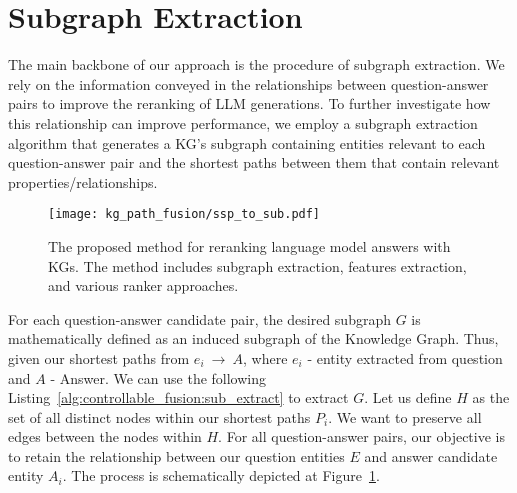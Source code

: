 
\section{Subgraph Extraction}
\label{sec:controllable_fusion:subgraph_extract}
The main backbone of our approach is the procedure of subgraph extraction. We rely on the information conveyed in the relationships between question-answer pairs to improve the reranking of LLM generations. To further investigate how this relationship can improve performance, we employ a subgraph extraction algorithm that generates a KG's subgraph containing entities relevant to each question-answer pair and the shortest paths between them that contain relevant properties/relationships. 

\begin{figure}[htb]
    \centering
    \texttt{[image: kg\_path\_fusion/ssp\_to\_sub.pdf]}
    \caption{The proposed method for reranking language model answers with KGs. The method includes subgraph extraction, features extraction, and various ranker approaches.}
    \label{fig:controllable_fusion:subgraph_construction_example}
\end{figure}

For each question-answer candidate pair, the desired subgraph $G$ is mathematically defined as an induced subgraph of the Knowledge Graph. Thus, given our shortest paths from $e_i~\rightarrow~A$, where $e_i$ - entity extracted from question and $A$ - Answer. We can use the following Listing~\ref{alg:controllable_fusion:sub_extract} to extract $G$. Let us define $H$ as the set of all distinct nodes within our shortest paths $P_i$. We want to preserve all edges between the nodes within $H$. For all question-answer pairs, our objective is to retain the relationship between our question entities $E$ and answer candidate entity $A_i$. The process is schematically depicted at Figure~\ref{fig:controllable_fusion:subgraph_construction_example}.


